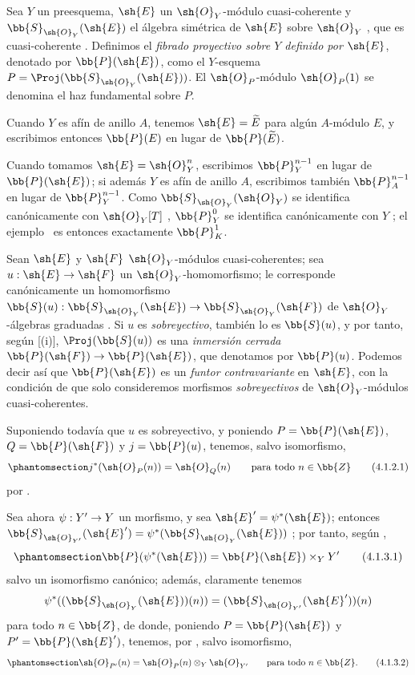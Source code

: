 \documentclass[oneside,10pt]{amsart}
\makeatletter
\newcommand{\ega@arrow}[2]{\mathchoice{#1}{#2}{#2}{#2}}
\renewcommand{\to}{\ega@arrow{\longrightarrow}{\rightarrow}}
\let\EGAOriginalLabel\label
\renewcommand{\label}[1]{\phantomsection\EGAOriginalLabel{#1}}
\makeatother
\begin{document}
\begin{definition}[4.1.1]
\label{II.4.1.1}
Sea $Y$ un preesquema, $\sh{E}$ un $\sh{O}_Y$-módulo cuasi-coherente y $\bb{S}_{\sh{O}_Y}(\sh{E})$ el álgebra simétrica de $\sh{E}$ sobre $\sh{O}_Y$ , que es cuasi-coherente .
Definimos el \emph{fibrado proyectivo sobre $Y$ definido por $\sh{E}$}, denotado por $\bb{P}(\sh{E})$, como el $Y$-esquema $P=\Proj(\bb{S}_{\sh{O}_Y}(\sh{E}))$.
El $\sh{O}_P$-módulo $\sh{O}_P(1)$ se denomina el haz fundamental sobre $P$.
\end{definition}

Cuando $Y$ es afín de anillo $A$, tenemos $\sh{E}=\widetilde{E}$ para algún $A$-módulo $E$, y escribimos entonces $\bb{P}(E)$ en lugar de $\bb{P}(\widetilde{E})$.

Cuando tomamos $\sh{E}=\sh{O}_Y^n$, escribimos $\bb{P}_Y^{n-1}$ en lugar de $\bb{P}(\sh{E})$;
si además $Y$ es afín de anillo $A$, escribimos también $\bb{P}_A^{n-1}$ en lugar de $\bb{P}_Y^{n-1}$.
Como $\bb{S}_{\sh{O}_Y}(\sh{O}_Y)$ se identifica canónicamente con $\sh{O}_Y[T]$ , $\bb{P}_Y^0$ se identifica canónicamente con $Y$ ;
el ejemplo~ es entonces exactamente $\bb{P}_K^1$.

\begin{env}[4.1.2]
\label{II.4.1.2}
Sean $\sh{E}$ y $\sh{F}$ $\sh{O}_Y$-módulos cuasi-coherentes;
sea $u:\sh{E}\to\sh{F}$ un $\sh{O}_Y$-homomorfismo;
le corresponde canónicamente un homomorfismo $\bb{S}(u):\bb{S}_{\sh{O}_Y}(\sh{E})\to\bb{S}_{\sh{O}_Y}(\sh{F})$ de $\sh{O}_Y$-álgebras graduadas .
Si $u$ es \emph{sobreyectivo}, también lo es $\bb{S}(u)$, y por tanto, según [(i)], $\Proj(\bb{S}(u))$ es una \emph{inmersión cerrada} $\bb{P}(\sh{F})\to\bb{P}(\sh{E})$, que denotamos por $\bb{P}(u)$.
Podemos decir así que $\bb{P}(\sh{E})$ es un \emph{funtor contravariante} en $\sh{E}$, con la condición de que solo consideremos morfismos \emph{sobreyectivos} de $\sh{O}_Y$-módulos cuasi-coherentes.

Suponiendo todavía que $u$ es sobreyectivo, y poniendo $P=\bb{P}(\sh{E})$, $Q=\bb{P}(\sh{F})$ y $j=\bb{P}(u)$, tenemos, salvo isomorfismo,
\[
\label{II.4.1.2.1}
  j^*(\sh{O}_P(n)) = \sh{O}_Q(n)
  \qquad\mbox{para todo $n\in\bb{Z}$}
  \tag{4.1.2.1}
\]
por .
\end{env}

\begin{env}[4.1.3]
\label{II.4.1.3}
Sea ahora $\psi:Y'\to Y$ un morfismo, y sea $\sh{E}'=\psi^*(\sh{E})$;
entonces $\bb{S}_{\sh{O}_{Y'}}(\sh{E}') = \psi^*(\bb{S}_{\sh{O}_Y}(\sh{E}))$ ;
por tanto, según ,
\[
\label{II.4.1.3.1}
  \bb{P}(\psi^*(\sh{E})) = \bb{P}(\sh{E})\times_Y Y'
  \tag{4.1.3.1}
\]
salvo un isomorfismo canónico;
además, claramente tenemos
\[
  \psi^*((\bb{S}_{\sh{O}_Y}(\sh{E}))(n)) = (\bb{S}_{\sh{O}_{Y'}}(\sh{E}'))(n)
\]
para todo $n\in\bb{Z}$, de donde, poniendo $P=\bb{P}(\sh{E})$ y $P'=\bb{P}(\sh{E}')$, tenemos, por , salvo isomorfismo,
\[
\label{II.4.1.3.2}
  \sh{O}_{P'}(n) = \sh{O}_P(n)\otimes_Y\sh{O}_{Y'}
  \qquad\mbox{para todo $n\in\bb{Z}$.}
  \tag{4.1.3.2}
\]
\end{env}
\end{document}
